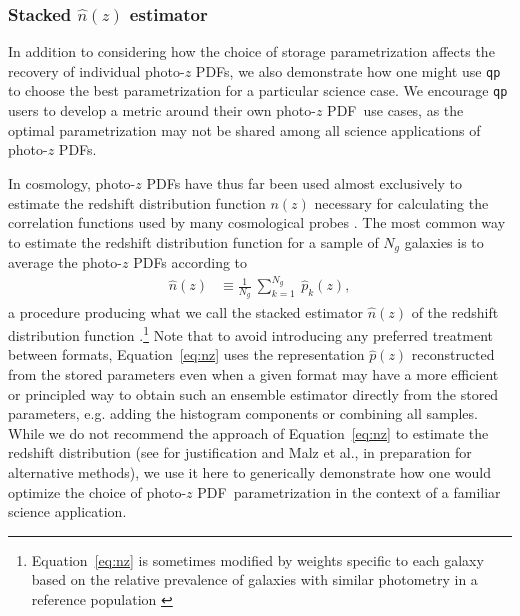 \documentclass[\docopts]{\docclass}
\newcommand{\pz}{photo-$z$ PDF}
\begin{document}
\subsubsection{Stacked $\hat{n}(z)$ estimator}
\label{sec:stacked_metric}

In addition to considering how the choice of storage parametrization affects 
the recovery of individual \pz s, we also demonstrate how one might use 
\texttt{qp} to choose the best parametrization for a particular science case.
We encourage \texttt{qp} users to develop a metric around their own \pz\ use 
cases, as the optimal parametrization may not be shared among all science 
applications of \pz s.

In cosmology, \pz s have thus far been used almost exclusively to estimate the 
redshift distribution function $n(z)$ necessary for calculating the correlation 
functions used by many cosmological probes \citep{clampitt_galaxygalaxy_2017, 
hildebrandt_kids-450:_2017}.
The most common way to estimate the redshift distribution function for a sample 
of $N_{g}$ galaxies is to average the \pz s according to
\begin{align}
  \label{eq:nz}
  \hat{n}(z) &\equiv \frac{1}{N_{g}}\ \sum_{k=1}^{N_{g}}\ \hat{p}_{k}(z),
\end{align}
a procedure producing what we call the stacked estimator $\hat{n}(z)$ of the 
redshift distribution function \citep{harnois-deraps_kids-450:_2017, 
hoyle_dark_2017}.\footnote{
Equation~\ref{eq:nz} is sometimes modified by weights specific to each galaxy 
based on the relative prevalence of galaxies with similar photometry in a 
reference population \citep{sheldon_photometric_2012, 
troster_cross-correlation_2017}
}
Note that to avoid introducing any preferred treatment between formats, 
Equation~\ref{eq:nz} uses the representation $\hat{p}(z)$ reconstructed from 
the stored parameters even when a given format may have a more efficient or 
principled way to obtain such an ensemble estimator directly from the stored 
parameters, e.g. adding the histogram components or combining all samples.
While we do not recommend the approach of Equation~\ref{eq:nz} to estimate the 
redshift distribution (see \citet{choi_cfhtlens_2016} for justification and 
Malz et al., in preparation for alternative methods), we use it here to 
generically demonstrate how one would optimize the choice of \pz\ 
parametrization in the context of a familiar science application.
\end{document}
